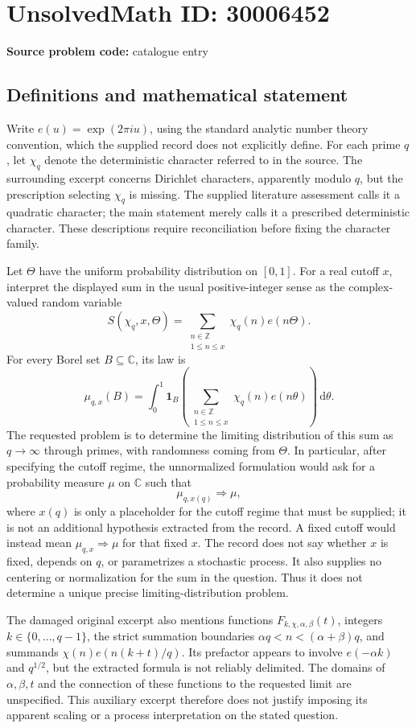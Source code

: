 \documentclass[11pt]{article}
\newcommand{\Z}{\mathbb{Z}}
\newcommand{\C}{\mathbb{C}}
\begin{document}
\section*{UnsolvedMath ID: 30006452}
\textbf{Source problem code:} catalogue entry
\subsection{Definitions and mathematical statement}
Write \(e(u)=\exp(2\pi i u)\), using the standard analytic number theory convention, which the supplied record does not explicitly define. For each prime \(q\), let \(\chi_q\) denote the deterministic character referred to in the source. The surrounding excerpt concerns Dirichlet characters, apparently modulo \(q\), but the prescription selecting \(\chi_q\) is missing. The supplied literature assessment calls it a quadratic character; the main statement merely calls it a prescribed deterministic character. These descriptions require reconciliation before fixing the character family.

Let \(\Theta\) have the uniform probability distribution on \([0,1]\). For a real cutoff \(x\), interpret the displayed sum in the usual positive-integer sense as the complex-valued random variable
\[
S(\chi_q,x,\Theta)=\sum_{\substack{n\in\Z\\1\leq n\leq x}}\chi_q(n)e(n\Theta).
\]
For every Borel set \(B\subseteq\C\), its law is
\[
\mu_{q,x}(B)=\int_0^1\mathbf{1}_{B}\!\left(\sum_{\substack{n\in\Z\\1\leq n\leq x}}\chi_q(n)e(n\theta)\right)\,\mathrm d\theta.
\]
The requested problem is to determine the limiting distribution of this sum as \(q\to\infty\) through primes, with randomness coming from \(\Theta\). In particular, after specifying the cutoff regime, the unnormalized formulation would ask for a probability measure \(\mu\) on \(\C\) such that
\[
\mu_{q,x(q)}\Longrightarrow\mu,
\]
where \(x(q)\) is only a placeholder for the cutoff regime that must be supplied; it is not an additional hypothesis extracted from the record. A fixed cutoff would instead mean \(\mu_{q,x}\Longrightarrow\mu\) for that fixed \(x\). The record does not say whether \(x\) is fixed, depends on \(q\), or parametrizes a stochastic process. It also supplies no centering or normalization for the sum in the question. Thus it does not determine a unique precise limiting-distribution problem.

The damaged original excerpt also mentions functions \(F_{k,\chi,\alpha,\beta}(t)\), integers \(k\in\{0,\ldots,q-1\}\), the strict summation boundaries \(\alpha q<n<(\alpha+\beta)q\), and summands \(\chi(n)e(n(k+t)/q)\). Its prefactor appears to involve \(e(-\alpha k)\) and \(q^{1/2}\), but the extracted formula is not reliably delimited. The domains of \(\alpha,\beta,t\) and the connection of these functions to the requested limit are unspecified. This auxiliary excerpt therefore does not justify imposing its apparent scaling or a process interpretation on the stated question.
\end{document}
